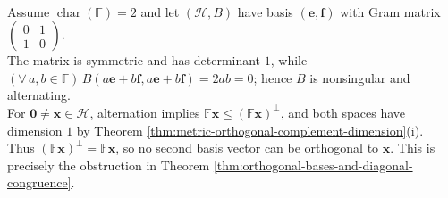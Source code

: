 \begin{example} \label{ex:characteristic-two-orthogonal-symplectic-plane} \\
Assume $\operatorname{char}(\mathbb{F})=2$ and let $(\mathcal{H},B)$ have basis $(\mathbf{e},\mathbf{f})$ with Gram matrix $\left(\begin{smallmatrix}0&1\\1&0\end{smallmatrix}\right)$.\\
The matrix is symmetric and has determinant $1$, while $(\forall\,a,b\in\mathbb{F})\,B(a\mathbf{e}+b\mathbf{f},a\mathbf{e}+b\mathbf{f})=2ab=0$; hence $B$ is nonsingular and alternating.\\
For $\mathbf{0}\neq\mathbf{x}\in\mathcal{H}$, alternation implies $\mathbb{F}\mathbf{x}\leq(\mathbb{F}\mathbf{x})^{\perp}$, and both spaces have dimension $1$ by Theorem \ref{thm:metric-orthogonal-complement-dimension}(i).\\
Thus $(\mathbb{F}\mathbf{x})^{\perp}=\mathbb{F}\mathbf{x}$, so no second basis vector can be orthogonal to $\mathbf{x}$. This is precisely the obstruction in Theorem \ref{thm:orthogonal-bases-and-diagonal-congruence}.
\end{example}

